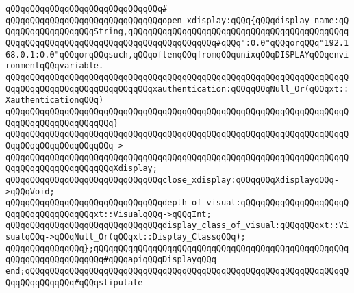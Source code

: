 \verb|qQQqqQQqqQQqqQQqqQQqqQQqqQQqqQQq#|\newline
\verb|qQQqqQQqqQQqqQQqqQQqqQQqqQQqqQQqopen_xdisplay:qQQq{qQQqdisplay_name:qQQqqQQqqQQqqQQqqQQqString,qQQqqQQqqQQqqQQqqQQqqQQqqQQqqQQqqQQqqQQqqQQqqQQqqQQqqQQqqQQqqQQqqQQqqQQqqQQqqQQqqQQqqQQq#qQQq":0.0"qQQqorqQQq"192.168.0.1:0.0"qQQqorqQQqsuch,qQQqoftenqQQqfromqQQqunixqQQqDISPLAYqQQqenvironmentqQQqvariable.|\newline
\verb|qQQqqQQqqQQqqQQqqQQqqQQqqQQqqQQqqQQqqQQqqQQqqQQqqQQqqQQqqQQqqQQqqQQqqQQqqQQqqQQqqQQqqQQqqQQqqQQqqQQqxauthentication:qQQqqQQqNull_Or(qQQqxt::XauthenticationqQQq)|\newline
\verb|qQQqqQQqqQQqqQQqqQQqqQQqqQQqqQQqqQQqqQQqqQQqqQQqqQQqqQQqqQQqqQQqqQQqqQQqqQQqqQQqqQQqqQQqqQQq}|\newline
\verb|qQQqqQQqqQQqqQQqqQQqqQQqqQQqqQQqqQQqqQQqqQQqqQQqqQQqqQQqqQQqqQQqqQQqqQQqqQQqqQQqqQQqqQQqqQQq->|\newline
\verb|qQQqqQQqqQQqqQQqqQQqqQQqqQQqqQQqqQQqqQQqqQQqqQQqqQQqqQQqqQQqqQQqqQQqqQQqqQQqqQQqqQQqqQQqqQQqXdisplay;|\newline
\newline
\verb|qQQqqQQqqQQqqQQqqQQqqQQqqQQqqQQqclose_xdisplay:qQQqqQQqXdisplayqQQq->qQQqVoid;|\newline
\newline
\verb|qQQqqQQqqQQqqQQqqQQqqQQqqQQqqQQqdepth_of_visual:qQQqqQQqqQQqqQQqqQQqqQQqqQQqqQQqqQQqqQQqxt::VisualqQQq->qQQqInt;|\newline
\verb|qQQqqQQqqQQqqQQqqQQqqQQqqQQqqQQqdisplay_class_of_visual:qQQqqQQqxt::VisualqQQq->qQQqNull_Or(qQQqxt::Display_ClassqQQq);|\newline
\newline
\verb|qQQqqQQqqQQqqQQq};qQQqqQQqqQQqqQQqqQQqqQQqqQQqqQQqqQQqqQQqqQQqqQQqqQQqqQQqqQQqqQQqqQQqqQQq#qQQqapiqQQqDisplayqQQq|\newline
\newline
\verb|end;qQQqqQQqqQQqqQQqqQQqqQQqqQQqqQQqqQQqqQQqqQQqqQQqqQQqqQQqqQQqqQQqqQQqqQQqqQQqqQQq#qQQqstipulate|\newline
\newline

